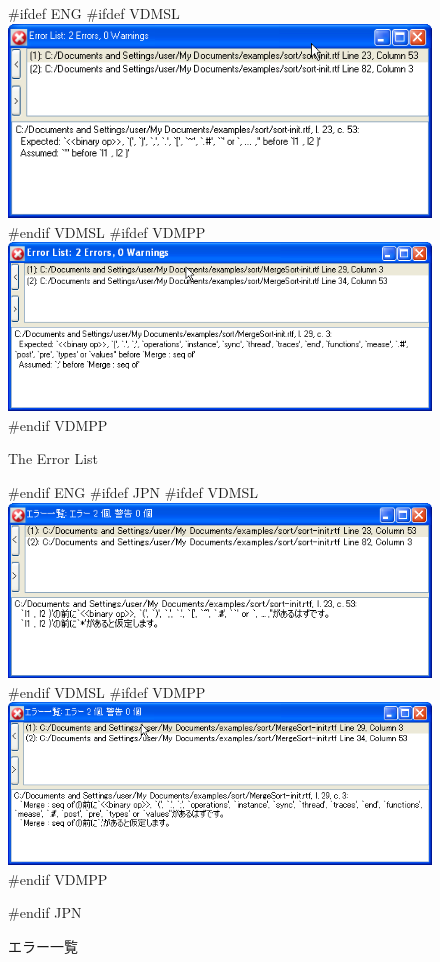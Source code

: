 \documentclass[\pformat,12pt]{article}
\begin{document}
\begin{figure}[tbh]
\begin{center}
#ifdef ENG
#ifdef VDMSL
\includegraphics[width=\textwidth]{errorList-slENG.png}
#endif VDMSL
#ifdef VDMPP
\includegraphics[width=\textwidth]{errorList-ppENG.png}
#endif VDMPP
\caption{The Error List}
#endif ENG
#ifdef JPN
#ifdef VDMSL
\includegraphics[width=\textwidth]{errorList-sl.png}
#endif VDMSL
#ifdef VDMPP
\includegraphics[width=\textwidth]{errorList-pp.png}
#endif VDMPP
\caption{エラー一覧}
#endif JPN
\label{fig:error2}
\end{center}
\end{figure}
\end{document}

